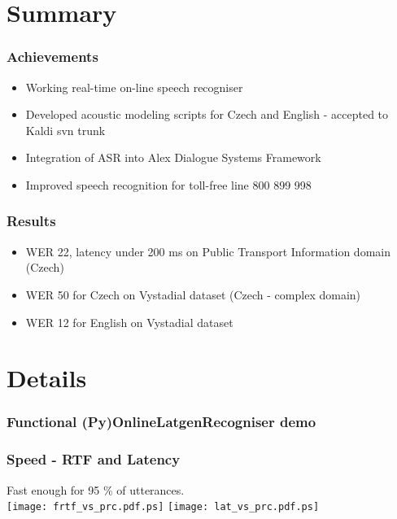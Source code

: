 \section{Summary} %

\begin{frame}\frametitle{Achievements} 
    \begin{itemize}
        \item Working real-time on-line speech recogniser
        \item Developed acoustic modeling scripts for Czech and English - accepted to Kaldi svn trunk
        \item Integration of ASR into Alex Dialogue Systems Framework
        \item Improved speech recognition for toll-free line 800 899 998
    \end{itemize}
\end{frame}

\begin{frame}\frametitle{Results} 
    \begin{itemize}
        \item WER 22, latency under 200 ms on Public Transport Information domain (Czech)
        \item WER 50 for Czech on Vystadial dataset (Czech - complex domain)
        \item WER 12 for English on Vystadial dataset 
    \end{itemize}
\end{frame}


\section{Details} %

\begin{frame}\frametitle{Functional (Py)OnlineLatgenRecogniser demo} 
    \begin{center}
        
    \end{center}
\end{frame}

\begin{frame}\frametitle{Speed - RTF and Latency} 
    Fast enough for 95 \% of utterances. \\
    \texttt{[image: frtf\_vs\_prc.pdf.ps]}
    \texttt{[image: lat\_vs\_prc.pdf.ps]}
\end{frame}


